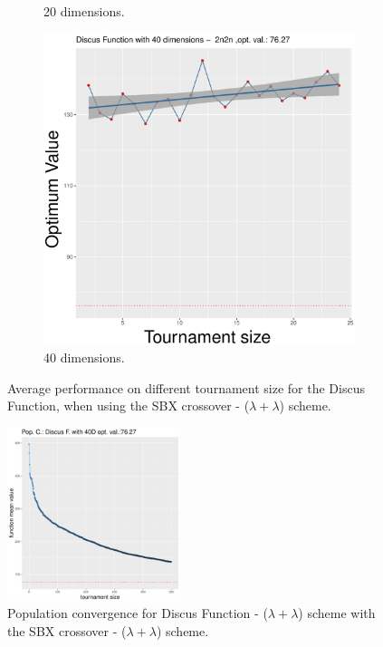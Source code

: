 \begin{figure}[t]
\begin{subfigure}[b]{0.33\textwidth}
		\caption{20 dimensions.}
	\end{subfigure}
	\begin{subfigure}[b]{0.33\textwidth}
		\centering
		\includegraphics[width=\textwidth]{img/2n2n-40D/unimodal_2n2n_11_dim_40.pdf}
		\caption{40 dimensions.}
	\end{subfigure}
	\caption{Average performance on different tournament size for the Discus Function, when using the SBX crossover - ($\lambda + \lambda$) scheme.}
	\label{sbx-11-B}
\end{figure}

\begin{figure}[t]
	\includegraphics[width=0.45\textwidth]{img/2n2n-40D/covergency_unimodal_2n2n_11_dim_40.pdf}
	\caption{Population convergence for Discus Function - ($\lambda + \lambda$) scheme with the SBX crossover - ($\lambda + \lambda$) scheme.}
	\label{convegence-11-b}
\end{figure}



